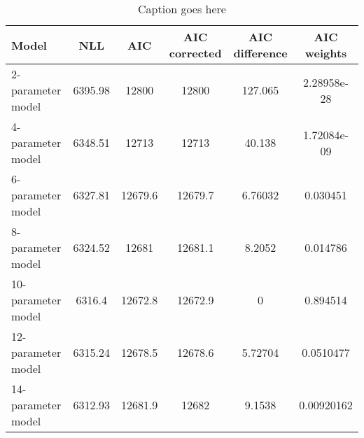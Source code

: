 
\begin{table}
   \centering
   \begin{tabular}{lccccc}
Model& NLL& AIC& AIC corrected& AIC difference& AIC weights\\
\hline
2-parameter model& 6395.98& 12800& 12800& 127.065& 2.28958e-28\\
4-parameter model& 6348.51& 12713& 12713& 40.138& 1.72084e-09\\
6-parameter model& 6327.81& 12679.6& 12679.7& 6.76032& 0.030451\\
8-parameter model& 6324.52& 12681& 12681.1& 8.2052& 0.014786\\
10-parameter model& 6316.4& 12672.8& 12672.9& 0& 0.894514\\
12-parameter model& 6315.24& 12678.5& 12678.6& 5.72704& 0.0510477\\
14-parameter model& 6312.93& 12681.9& 12682& 9.1538& 0.00920162\\
   \end{tabular}
   \caption{Caption goes here}
   \label{tab:myfirsttable}
\end{table}

